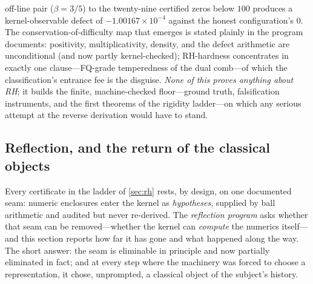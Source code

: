 off-line pair ($\beta = 3/5$) to the twenty-nine certified zeros below $100$
produces a kernel-observable defect of $-1.00167\times10^{-4}$ against the
honest configuration's $0$. The conservation-of-difficulty map that emerges
is stated plainly in the program documents: positivity, multiplicativity,
density, and the defect arithmetic are unconditional (and now partly
kernel-checked); RH-hardness concentrates in exactly one clause---FQ-grade
temperedness of the dual comb---of which the classification's entrance fee
is the disguise. \emph{None of this proves anything about RH}; it builds the
finite, machine-checked floor---ground truth, falsification instruments, and
the first theorems of the rigidity ladder---on which any serious attempt at
the reverse derivation would have to stand.

\subsection{Reflection, and the return of the classical objects}
\label{sec:reflection}

Every certificate in the ladder of \cref{sec:rh} rests, by design, on one
documented seam: numeric enclosures enter the kernel as \emph{hypotheses},
supplied by ball arithmetic and audited but never re-derived. The
\emph{reflection program} asks whether that seam can be removed---whether the
kernel can \emph{compute} the numerics itself---and this section reports how
far it has gone and what happened along the way. The short answer: the seam
is eliminable in principle and now partially eliminated in fact; and at every
step where the machinery was forced to choose a representation, it chose,
unprompted, a classical object of the subject's history.

